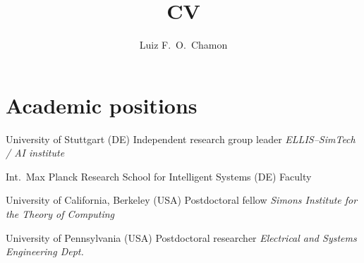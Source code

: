 \documentclass{cvlfoc}
\author[Luiz F.\ O.\ Chamon]{Luiz F.\ O.\ Chamon}
\title{CV}
\begin{document}
\maketitle
{}


%
%
%
%



\section*{Academic positions}

\begin{entrydate}
		{University of Stuttgart (DE)}
		{Independent research group leader}
		{\emph{ELLIS--SimTech / AI institute}}

		{Int.\ Max Planck Research School for Intelligent Systems (DE)}
		{Faculty}
		{}

		{University of California, Berkeley (USA)}
		{Postdoctoral fellow}
		{\emph{Simons Institute for the Theory of Computing}}

		{University of Pennsylvania (USA)}
		{Postdoctoral researcher}
		{\emph{Electrical and Systems Engineering Dept.}}
\end{entrydate}
\end{document}
